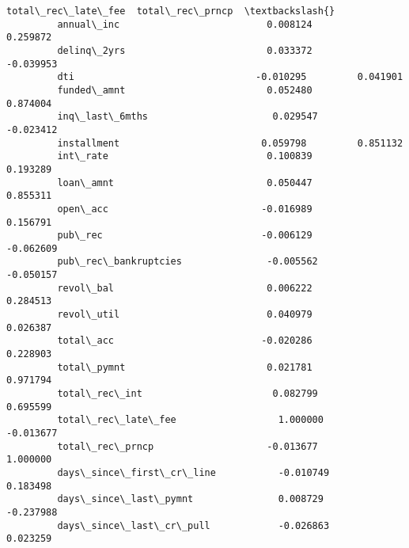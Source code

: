 \documentclass[10pt,notitlepage,onecolumn,aps,pra]{revtex4-1}
\begin{document}
\begin{Verbatim}[commandchars=\\\{\}]
                                   total\_rec\_late\_fee  total\_rec\_prncp  \textbackslash{}
         annual\_inc                          0.008124         0.259872   
         delinq\_2yrs                         0.033372        -0.039953   
         dti                                -0.010295         0.041901   
         funded\_amnt                         0.052480         0.874004   
         inq\_last\_6mths                      0.029547        -0.023412   
         installment                         0.059798         0.851132   
         int\_rate                            0.100839         0.193289   
         loan\_amnt                           0.050447         0.855311   
         open\_acc                           -0.016989         0.156791   
         pub\_rec                            -0.006129        -0.062609   
         pub\_rec\_bankruptcies               -0.005562        -0.050157   
         revol\_bal                           0.006222         0.284513   
         revol\_util                          0.040979         0.026387   
         total\_acc                          -0.020286         0.228903   
         total\_pymnt                         0.021781         0.971794   
         total\_rec\_int                       0.082799         0.695599   
         total\_rec\_late\_fee                  1.000000        -0.013677   
         total\_rec\_prncp                    -0.013677         1.000000   
         days\_since\_first\_cr\_line           -0.010749         0.183498   
         days\_since\_last\_pymnt               0.008729        -0.237988   
         days\_since\_last\_cr\_pull            -0.026863         0.023259   
         

\end{Verbatim}
\end{document}
